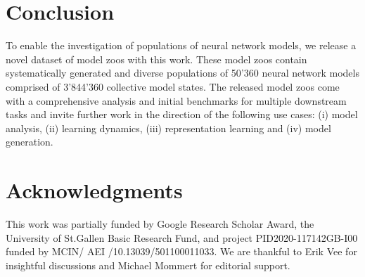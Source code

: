 \documentclass{article}
\begin{document}
\section{Conclusion}
To enable the investigation of populations of neural network models, we release a novel dataset of model zoos with this work. 
These model zoos contain systematically generated and diverse populations of 50'360 neural network models comprised of 3'844'360 collective model states. 
The released model zoos come with a comprehensive analysis and initial benchmarks for multiple downstream tasks and invite further work in the direction of the following use cases: (i) model analysis, (ii) learning dynamics, (iii) representation learning and (iv) model generation.


\section*{Acknowledgments}
This work was partially funded by Google Research Scholar Award, the University of St.Gallen Basic Research Fund, and project PID2020-117142GB-I00 funded by MCIN/ AEI /10.13039/501100011033.
We are thankful to Erik Vee for insightful discussions and Michael Mommert for editorial support.


\FloatBarrier
\newpage



% 




\appendix

\newpage

\end{document}
